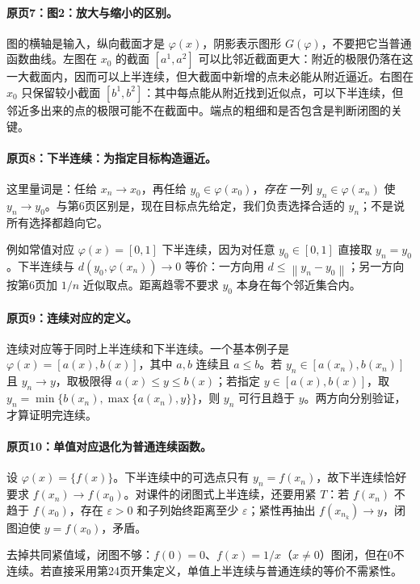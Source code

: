 \documentclass[11pt,a4paper]{article}
\newcommand{\eps}{\varepsilon}
\newcommand{\norm}[1]{\left\lVert#1\right\rVert}
\theoremstyle{definition}\newtheorem{definition}{定义}\newtheorem{example}{例}
\begin{document}
\paragraph{原页7：图2：放大与缩小的区别。}图的横轴是输入，纵向截面才是 $\varphi(x)$，阴影表示图形 $G(\varphi)$，不要把它当普通函数曲线。左图在 $x_0$ 的截面 $[a^1,a^2]$ 可以比邻近截面更大：附近的极限仍落在这一大截面内，因而可以上半连续，但大截面中新增的点未必能从附近逼近。右图在 $x_0$ 只保留较小截面 $[b^1,b^2]$：其中每点能从附近找到近似点，可以下半连续，但邻近多出来的点的极限可能不在截面中。端点的粗细和是否包含是判断闭图的关键。



\paragraph{原页8：下半连续：为指定目标构造逼近。}这里量词是：任给 $x_n\to x_0$，再任给 $y_0\in\varphi(x_0)$，\emph{存在} 一列 $y_n\in\varphi(x_n)$ 使 $y_n\to y_0$。与第6页区别是，现在目标点先给定，我们负责选择合适的 $y_n$；不是说所有选择都趋向它。

例如常值对应 $\varphi(x)=[0,1]$ 下半连续，因为对任意 $y_0\in[0,1]$ 直接取 $y_n=y_0$。下半连续与 $d(y_0,\varphi(x_n))\to0$ 等价：一方向用 $d\le\norm{y_n-y_0}$；另一方向按第6页加 $1/n$ 近似取点。距离趋零不要求 $y_0$ 本身在每个邻近集合内。



\paragraph{原页9：连续对应的定义。}连续对应等于同时上半连续和下半连续。一个基本例子是 $\varphi(x)=[a(x),b(x)]$，其中 $a,b$ 连续且 $a\le b$。若 $y_n\in[a(x_n),b(x_n)]$ 且 $y_n\to y$，取极限得 $a(x)\le y\le b(x)$；若指定 $y\in[a(x),b(x)]$，取 $y_n=\min\{b(x_n),\max\{a(x_n),y\}\}$，则 $y_n$ 可行且趋于 $y$。两方向分别验证，才算证明完连续。



\paragraph{原页10：单值对应退化为普通连续函数。}设 $\varphi(x)=\{f(x)\}$。下半连续中的可选点只有 $y_n=f(x_n)$，故下半连续恰好要求 $f(x_n)\to f(x_0)$。对课件的闭图式上半连续，还要用紧 $T$：若 $f(x_n)$ 不趋于 $f(x_0)$，存在 $\eps>0$ 和子列始终距离至少 $\eps$；紧性再抽出 $f(x_{n_k})\to y$，闭图迫使 $y=f(x_0)$，矛盾。

去掉共同紧值域，闭图不够：$f(0)=0$、$f(x)=1/x$（$x\ne0$）图闭，但在0不连续。若直接采用第24页开集定义，单值上半连续与普通连续的等价不需紧性。
\end{document}
